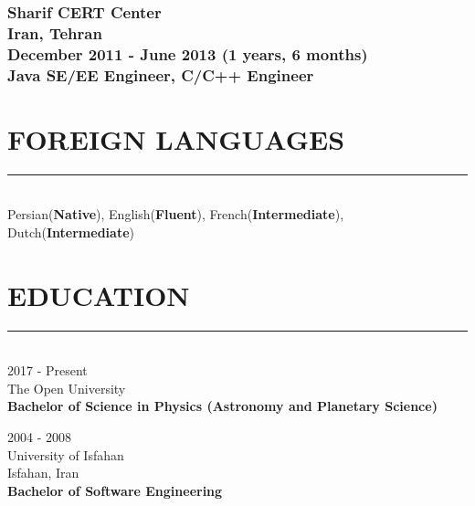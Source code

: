 \documentclass[10pt,a4paper]{article}
\begin{document}
\subsubsection{{ \textbullet \hspace{0.1cm} \large Sharif CERT Center} \\ 
\textnormal{Iran, Tehran} \\ 
\textnormal{December 2011 - June 2013 (1 years, 6 months)} \\ 
{Java SE/EE Engineer, C/C++ Engineer}}
\vspace{0.5cm}


\section{FOREIGN LANGUAGES}
\noindent \rule {5.5cm}{0.4pt} \\
    Persian(\textbf{Native}),
    English(\textbf{Fluent}),
    French(\textbf{Intermediate}),
    Dutch(\textbf{Intermediate})

\section{EDUCATION}
\noindent \rule {3.0cm}{0.4pt} \\
\textbullet \hspace{0.1cm} 2017 - Present \\
The Open University \\
\textbf{Bachelor of Science in Physics (Astronomy and Planetary Science)}
\vspace{0.3cm}

\noindent \textbullet \hspace{0.1cm}  2004 - 2008 \\
University of Isfahan \\
Isfahan, Iran \\
\textbf{Bachelor of Software Engineering}
\end{document}

